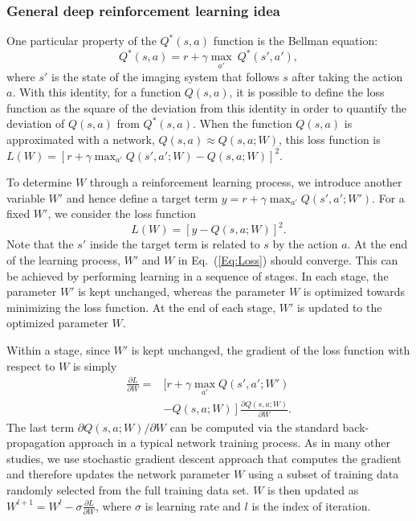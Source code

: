 \documentclass[journal]{IEEEtran}
\begin{document}
\subsubsection{General deep reinforcement learning idea}

One particular property of the $Q^*(s,a)$ function is the Bellman equation\cite{Bellman1964dynamic}:
\begin{equation}
	Q^*(s,a) = r + \gamma\max_{a'}~Q^*(s',a'),
\end{equation} 
where $s'$ is the state of the imaging system that follows $s$ after taking the action $a$. With this identity, for a function $Q(s,a)$, it is possible to define the loss function as the square of the deviation from this identity in order to quantify the deviation of $Q(s,a)$ from $Q^*(s,a)$. When the function $Q(s,a)$ is approximated with a network,  $Q(s,a)\approx Q(s,a;W)$, this loss function is $L(W)= [r + \gamma\max_{a'}Q(s',a';W) - Q(s,a;W)]^2$.

To determine $W$ through a reinforcement learning process, we introduce another variable $W'$ and hence define a target term $y = r + \gamma\max_{a'}Q(s',a';W')$. For a fixed $W'$, we consider the loss function 
\begin{equation}
	L(W)= [y - Q(s,a;W)]^2.
\label{Eq:Loss}
\end{equation}
Note that the $s'$ inside the target term is related to $s$ by the action $a$. At the end of the learning process, $W'$ and $W$ in  Eq.~(\ref{Eq:Loss}) should converge. This can be achieved by performing learning in a sequence of stages. In each stage, the parameter $W'$ is kept unchanged, whereas the parameter $W$ is optimized towards minimizing the loss function. At the end of each stage, $W'$ is updated to the optimized parameter $W$. 

Within a stage, since $W'$ is kept unchanged, the gradient of the loss function with respect to $W$ is simply
\begin{equation}
\begin{split}
	\frac{\partial L}{\partial W}=&[r+\gamma\max_{a'}Q(s',a';W')\\
	&\left.-Q(s,a;W)\right]\frac{\partial Q(s,a;W)}{\partial W}.
\end{split}
\label{Eq:grad}
\end{equation}
The last term $\partial Q(s,a;W)/\partial W$ can be computed via the standard back-propagation approach in a typical network training process. As in many other studies, we use stochastic gradient descent approach that computes the gradient and therefore updates the network parameter $W$ using a subset of training data randomly selected from the full training data set. $W$ is then updated as $W^{l+1}=W^l-\sigma\frac{\partial L}{\partial W}$, where $\sigma$ is learning rate and $l$ is the index of iteration. 
\end{document}

